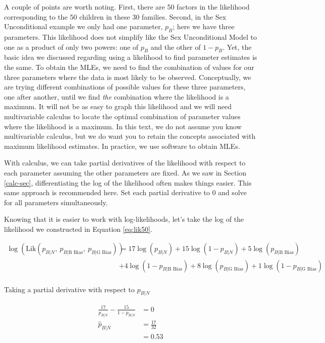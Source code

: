 \documentclass[
]{krantz}
\newcommand{\lik}{\mathrm{Lik}}
\newcommand{\neutral}{p_{B|N}}
\newcommand{\gbias}{p_{B|\textrm{G Bias}}}
\newcommand{\bbias}{p_{B|\textrm{B Bias}}}
\begin{document}
A couple of points are worth noting. First, there are 50 factors in the likelihood corresponding to the 50 children in these 30 families. Second, in the Sex Unconditional example we only had one parameter, \(p_{B}\); here we have three parameters. This likelihood does not simplify like the Sex Unconditional Model to one as a product of only two powers: one of \(p_B\) and the other of \(1-p_B\). Yet, the basic idea we discussed regarding using a likelihood to find parameter estimates is the same. To obtain the MLEs, we need to find the combination of values for our three parameters where the data is most likely to be observed. Conceptually, we are trying different combinations of possible values for these three parameters, one after another, until we find \emph{the} combination where the likelihood is a maximum. It will not be as easy to graph this likelihood and we will need multivariable calculus to locate the optimal combination of parameter values where the likelihood is a maximum. In this text, we do not assume you know multivariable calculus, but we do want you to retain the concepts associated with maximum likelihood estimates. In practice, we use software to obtain MLEs.

With calculus, we can take partial derivatives of the likelihood with respect to each parameter assuming the other parameters are fixed. As we saw in Section \ref{calc-sec}, differentiating the log of the likelihood often makes things easier. This same approach is recommended here. Set each partial derivative to 0 and solve for all parameters simultaneously.

Knowing that it is easier to work with log-likelihoods, let's take the log of the likelihood we constructed in Equation \eqref{eq:lik50}.

\begin{align*}
\log (\lik(\neutral,\ \bbias,\ \gbias)) &= 
        17\log(\neutral)+15\log(1-\neutral)+5\log(\bbias) \\
    & +4\log(1-\bbias) +8\log(\gbias) +1\log(1-\gbias) \\
\end{align*}

Taking a partial derivative with respect to \(\neutral\)

\begin{align*}
\frac{17}{\neutral}  - \frac{15}{1-\neutral}&=0 \\
\hat{p}_{B|N}&= \frac{17}{32} \\
&=0.53 \\
\end{align*}
\end{document}
